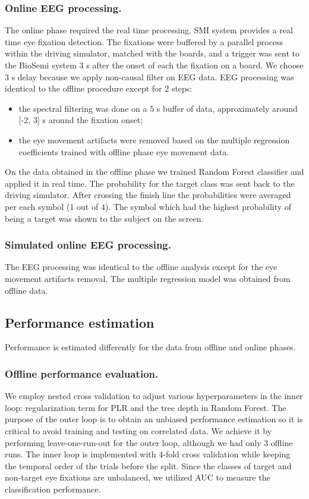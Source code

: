 \documentclass[12pt]{iopart}
\begin{document}
\subsubsection*{Online EEG processing.}
The online phase required the real time processing. SMI system provides
a real time eye fixation detection. The fixations were buffered
by a parallel process within the driving simulator, matched with the boards,
and a trigger was sent to the BioSemi system 3 s after the onset of each the fixation
on a board. We choose 3 s delay because we apply non-causal filter on EEG data.
EEG processing  was identical to the offline procedure
except for 2 steps:
\begin{itemize}
    \item the spectral filtering was done on a 5 s buffer of data,
        approximately around [-2, 3] s around the fixation onset;
    \item the eye movement artifacts were removed based on the multiple
        regression coefficients trained with offline phase eye movement data.
\end{itemize}
On the data obtained in the offline phase we trained Random Forest classifier
and applied it in real time. The probability for the target class was sent
back to the driving simulator. After crossing the finish line
the probabilities were averaged per each symbol (1 out of 4).
The symbol which had the highest probability of being a target was
shown to the subject on the screen.

\subsubsection*{Simulated online EEG processing.}
The EEG processing was identical to the offline analysis
except for the eye movement artifacts removal. The multiple regression
model was obtained from offline data.

\subsection{Performance estimation}

Performance is estimated differently for the data from offline and online
phases.
\subsubsection*{Offline performance evaluation.}
We employ nested cross validation to adjust various hyperparameters in the inner loop:
regularization term for PLR and the tree depth in Random Forest.
The purpose of the outer loop is to obtain an unbiased performance estimation
so it is critical to avoid training and testing on correlated data.
We achieve it by performing leave-one-run-out for the outer loop,
although we had only 3 offline runs.
The inner loop is implemented with 4-fold cross validation while keeping
the temporal order of the trials before the split.
Since the classes of target and non-target eye fixations are unbalanced,
we utilized AUC to measure the classification performance.
\end{document}
